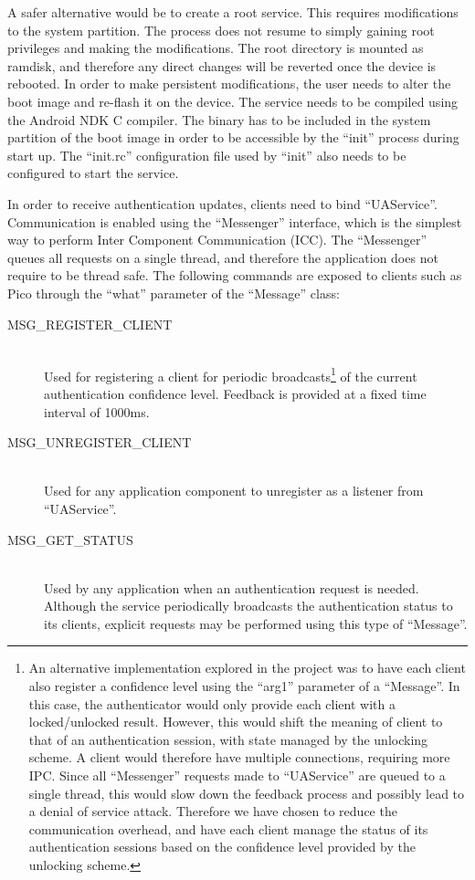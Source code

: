 A safer alternative would be to create a root service. This requires modifications to the system partition. The process does not resume to simply gaining root privileges and making the modifications. The root directory is mounted as ramdisk, and therefore any direct changes will be reverted once the device is rebooted. In order to make persistent modifications, the user needs to alter the boot image and re-flash it on the device. The service needs to be compiled using the Android NDK C compiler. The binary has to be included in the system partition of the boot image in order to be accessible by the ``init'' process during start up. The ``init.rc'' configuration file used by ``init'' also needs to be configured to start the service.

In order to receive authentication updates, clients need to bind ``UAService''. Communication is enabled using the ``Messenger'' interface, which is the simplest way to perform Inter Component Communication (ICC). The ``Messenger'' queues all requests on a single thread, and therefore the application does not require to be thread safe. The following commands are exposed to clients such as Pico through the ``what'' parameter of the ``Message'' class:
\begin{description}
  \item[MSG\_REGISTER\_CLIENT] \hfill \\
  Used for registering a client for periodic broadcasts\footnote{An alternative implementation explored in the project was to have each client also register a confidence level using the ``arg1'' parameter of a ``Message''. In this case, the authenticator would only provide each client with a locked/unlocked result. However, this would shift the meaning of client to that of an authentication session, with state managed by the unlocking scheme. A client would therefore have multiple connections, requiring more IPC. Since all ``Messenger'' requests made to ``UAService'' are queued to a single thread, this would slow down the feedback process and possibly lead to a denial of service attack. Therefore we have chosen to reduce the communication overhead, and have each client manage the status of its authentication sessions based on the confidence level provided by the unlocking scheme.} of the current authentication confidence level. Feedback is provided at a fixed time interval of 1000ms.

  \item[MSG\_UNREGISTER\_CLIENT] \hfill \\
  Used for any application component to unregister as a listener from ``UAService''.
  
  \item[MSG\_GET\_STATUS] \hfill \\
  Used by any application when an authentication request is needed. Although the service periodically broadcasts the authentication status to its clients, explicit requests may be performed using this type of ``Message''.
\end{description}


